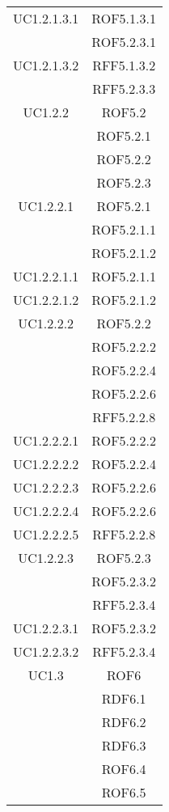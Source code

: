 \begin{longtable}{|c|c|}
\midrule
UC1.2.1.3.1
& ROF5.1.3.1\\
& ROF5.2.3.1\\

\midrule
UC1.2.1.3.2
& RFF5.1.3.2\\
& RFF5.2.3.3\\

\midrule
UC1.2.2
& ROF5.2\\
& ROF5.2.1\\
& ROF5.2.2\\
& ROF5.2.3\\

\midrule
UC1.2.2.1
& ROF5.2.1\\
& ROF5.2.1.1\\
& ROF5.2.1.2\\

\midrule
UC1.2.2.1.1
& ROF5.2.1.1\\

\midrule
UC1.2.2.1.2
& ROF5.2.1.2\\

\midrule
UC1.2.2.2
& ROF5.2.2\\
& ROF5.2.2.2\\
& ROF5.2.2.4\\
& ROF5.2.2.6\\
& RFF5.2.2.8\\

\midrule
UC1.2.2.2.1
& ROF5.2.2.2\\

\midrule
UC1.2.2.2.2
& ROF5.2.2.4\\

\midrule
UC1.2.2.2.3
& ROF5.2.2.6\\

\midrule
UC1.2.2.2.4
& ROF5.2.2.6\\

\midrule
UC1.2.2.2.5
& RFF5.2.2.8\\

\midrule
UC1.2.2.3
& ROF5.2.3\\
& ROF5.2.3.2\\
& RFF5.2.3.4\\

\midrule
UC1.2.2.3.1
& ROF5.2.3.2\\

\midrule
UC1.2.2.3.2
& RFF5.2.3.4\\

\midrule
UC1.3
& ROF6\\
& RDF6.1\\
& RDF6.2\\
& RDF6.3\\
& ROF6.4\\
& ROF6.5\\


\end{longtable}

